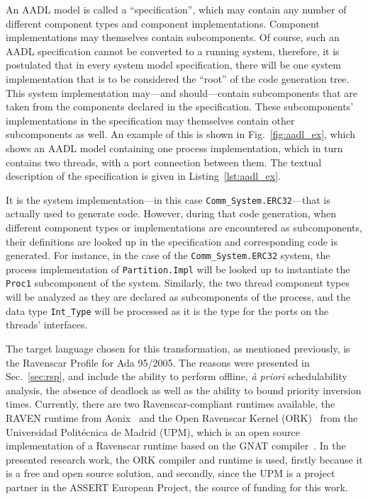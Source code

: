 An AADL model is called a ``specification'', which may contain any
number of different component types and component
implementations. Component implementations may themselves contain
subcomponents. Of course, such an AADL specification cannot be
converted to a running system, therefore, it is postulated that in
every system model specification, there will be one system
implementation that is to be considered the ``root'' of the code
generation tree. This system implementation may---and should---contain
subcomponents that are taken from the components declared in the
specification. These subcomponents' implementations in the
specification may themselves contain other subcomponents as well. An
example of this is shown in Fig.~\ref{fig:aadl_ex}, which shows an
AADL model containing one process implementation, which in turn
contains two threads, with a port connection between them. The textual
description of the specification is given in
Listing~\ref{lst:aadl_ex}.

It is the system implementation---in this case
\texttt{Comm\_System.ERC32}---that is actually used to generate
code. However, during that code generation, when different component
types or implementations are encountered as subcomponents, their
definitions are looked up in the specification and corresponding code
is generated. For instance, in the case of the
\texttt{Comm\_System.ERC32} system, the process implementation of
\texttt{Partition.Impl} will be looked up to instantiate the
\texttt{Proc1} subcomponent of the system. Similarly, the two thread
component types will be analyzed as they are declared as subcomponents
of the process, and the data type \texttt{Int\_Type} will be processed
as it is the type for the ports on the threads' interfaces.

The target language chosen for this transformation, as mentioned
previously, is the Ravenscar Profile for Ada 95/2005. The reasons were
presented in Sec.~\ref{sec:rsp}, and include the ability to perform
offline, \emph{\`a priori} schedulability analysis, the absence of
deadlock as well as the ability to bound priority inversion
times. Currently, there are two Ravenscar-compliant runtimes
available, the RAVEN runtime from Aonix~\cite{aonix-raven} and the
Open Ravenscar Kernel (ORK)~\cite{puente@ae00} from the Universidad
Polit\'ecnica de Madrid (UPM), which is an open source implementation
of a Ravenscar runtime based on the GNAT compiler~\cite{gnu-gnat}. In
the presented research work, the ORK compiler and runtime is used,
firstly because it is a free and open source solution, and secondly,
since the UPM is a project partner in the ASSERT European Project, the
source of funding for this work.

